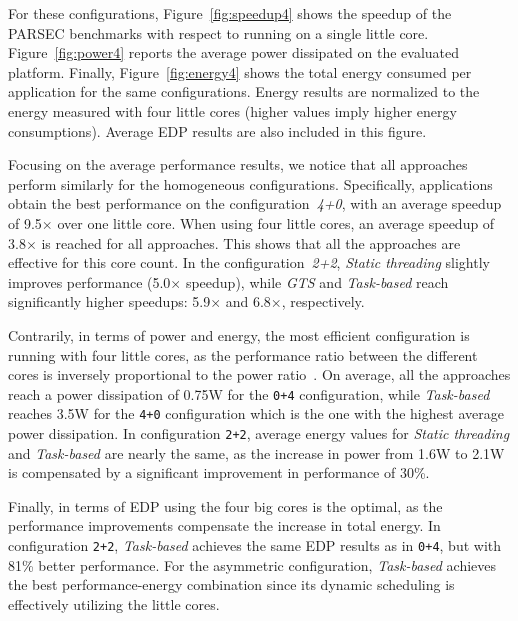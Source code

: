 For these configurations, Figure~\ref{fig:speedup4} shows the speedup of the PARSEC benchmarks with respect to running on a single little core. Figure~\ref{fig:power4} reports the average power dissipated on the evaluated platform. Finally, Figure~\ref{fig:energy4} shows the total energy consumed per application for the same configurations. Energy results are normalized to the energy measured with four little cores (higher values imply higher energy consumptions). Average EDP results are also included in this figure.

Focusing on the average performance results, we notice that all approaches perform similarly for the homogeneous configurations. 
Specifically, applications obtain the best performance on the configuration~\emph{4+0}, with an average speedup of 9.5$\times$ over one little core. 
When using four little cores, an average speedup of 3.8$\times$ is reached for all approaches. 
This shows that all the approaches are effective for this core count. 
In the configuration~\emph{2+2}, \emph{Static threading} slightly improves performance (5.0$\times$ speedup), while \emph{GTS} and \emph{Task-based} reach significantly higher speedups: 5.9$\times$ and 6.8$\times$, respectively.

Contrarily, in terms of power and energy, the most efficient configuration is running with four little cores, as the performance ratio between the different cores is inversely proportional to the power ratio~\cite{Greenhalgh2011}. On average, all the approaches reach a power dissipation of 0.75W for the \texttt{0+4} configuration, while \emph{Task-based} reaches 3.5W for the \texttt{4+0} configuration which is the one with the highest average power dissipation. In configuration \texttt{2+2}, average energy values for \emph{Static threading} and \emph{Task-based} are nearly the same, as the increase in power from 1.6W to 2.1W is compensated by a significant improvement in performance of 30\%.

Finally, in terms of EDP using the four big cores is the optimal, as the performance improvements compensate the increase in total energy. 
In configuration \texttt{2+2}, \emph{Task-based} achieves the same EDP results as in \texttt{0+4}, but with 81\% better performance. 
For the asymmetric configuration, \emph{Task-based} achieves the best performance-energy combination since its dynamic scheduling is effectively utilizing the little cores. 


